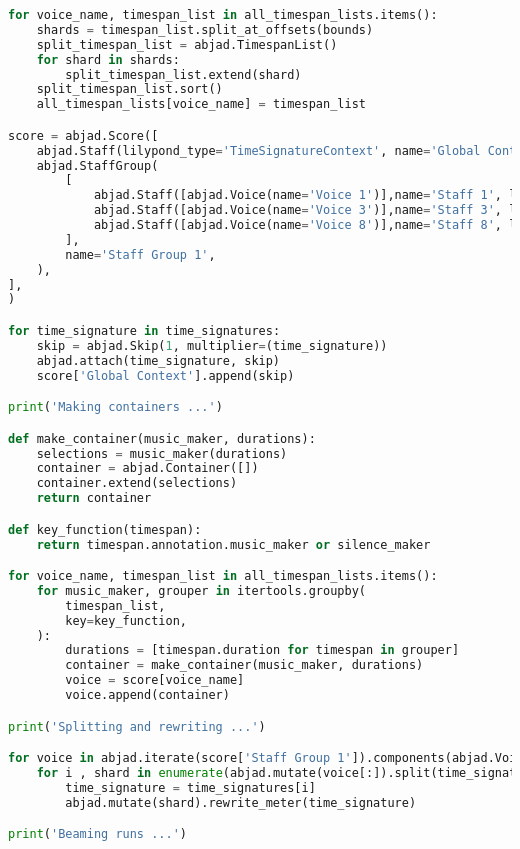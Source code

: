 \begin{lstlisting}[language=Python, caption=Four Ages of Sand Segment\_III]
for voice_name, timespan_list in all_timespan_lists.items():
    shards = timespan_list.split_at_offsets(bounds)
    split_timespan_list = abjad.TimespanList()
    for shard in shards:
        split_timespan_list.extend(shard)
    split_timespan_list.sort()
    all_timespan_lists[voice_name] = timespan_list

score = abjad.Score([
    abjad.Staff(lilypond_type='TimeSignatureContext', name='Global Context'),
    abjad.StaffGroup(
        [
            abjad.Staff([abjad.Voice(name='Voice 1')],name='Staff 1', lilypond_type='Staff',),
            abjad.Staff([abjad.Voice(name='Voice 3')],name='Staff 3', lilypond_type='Staff',),
            abjad.Staff([abjad.Voice(name='Voice 8')],name='Staff 8', lilypond_type='Staff',),
        ],
        name='Staff Group 1',
    ),
],
)

for time_signature in time_signatures:
    skip = abjad.Skip(1, multiplier=(time_signature))
    abjad.attach(time_signature, skip)
    score['Global Context'].append(skip)

print('Making containers ...')

def make_container(music_maker, durations):
    selections = music_maker(durations)
    container = abjad.Container([])
    container.extend(selections)
    return container

def key_function(timespan):
    return timespan.annotation.music_maker or silence_maker

for voice_name, timespan_list in all_timespan_lists.items():
    for music_maker, grouper in itertools.groupby(
        timespan_list,
        key=key_function,
    ):
        durations = [timespan.duration for timespan in grouper]
        container = make_container(music_maker, durations)
        voice = score[voice_name]
        voice.append(container)

print('Splitting and rewriting ...')

for voice in abjad.iterate(score['Staff Group 1']).components(abjad.Voice):
    for i , shard in enumerate(abjad.mutate(voice[:]).split(time_signatures)):
        time_signature = time_signatures[i]
        abjad.mutate(shard).rewrite_meter(time_signature)

print('Beaming runs ...')


\end{lstlisting}
